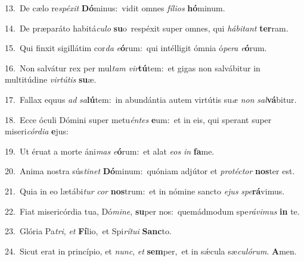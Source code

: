{\numbfont\textcolor{\numbcolor}{13.}}~De cælo re\-\textit{spé}\-\textit{xit} \textbf{Dó}\-minus:~\star vidit omnes \textit{fí}\-\textit{li}\textit{os} \textbf{hó}\-minum.\par
{\numbfont\textcolor{\numbcolor}{14.}}~De præparáto habitá\-\textit{cu}\-\textit{lo} \textbf{su}\-o~\star respéxit super omnes, qui \textit{há}\-\textit{bi}\textit{tant} \textbf{ter}\-ram.\par
{\numbfont\textcolor{\numbcolor}{15.}}~Qui finxit sigillátim cor\textit{da} \textit{e}\-\textbf{ó}rum:~\star qui intélligit ómnia ó\-\textit{pe}\-\textit{ra} \textit{e}\-\textbf{ó}rum.\par
{\numbfont\textcolor{\numbcolor}{16.}}~Non salvátur rex per mul\textit{tam} \textit{vir}\-\textbf{tú}tem:~\star et gigas non salvábitur in multitúdine \textit{vir}\-\textit{tú}\textit{tis} \textbf{su}\-æ.\par
{\numbfont\textcolor{\numbcolor}{17.}}~Fallax equus \textit{ad} \textit{sa}\-\textbf{lú}tem:~\star in abundántia autem virtútis su\textit{æ} \textit{non} \textit{sal}\-\textbf{vá}bitur.\par
{\numbfont\textcolor{\numbcolor}{18.}}~Ecce óculi Dómini super metu\-\textit{én}\-\textit{tes} \textbf{e}\-um:~\star et in eis, qui sperant super miseri\-\textit{cór}\-\textit{di}\textit{a} \textbf{e}\-jus:\par
{\numbfont\textcolor{\numbcolor}{19.}}~Ut éruat a morte áni\textit{mas} \textit{e}\-\textbf{ó}rum:~\star et alat \textit{e}\-\textit{os} \textit{in} \textbf{fa}\-me.\par
{\numbfont\textcolor{\numbcolor}{20.}}~Anima nostra sús\-\textit{ti}\-\textit{net} \textbf{Dó}\-minum:~\star quóniam adjútor et \textit{pro}\-\textit{téc}\textit{tor} \textbf{nos}\-ter est.\par
{\numbfont\textcolor{\numbcolor}{21.}}~Quia in eo lætábi\textit{tur} \textit{cor} \textbf{nos}\-trum:~\star et in nómine sancto \textit{e}\-\textit{jus} \textit{spe}\-\textbf{rá}vimus.\par
{\numbfont\textcolor{\numbcolor}{22.}}~Fiat misericórdia tua, Dó\-\textit{mi}\-\textit{ne}, \textbf{su}\-per nos:~\star quemádmodum spe\-\textit{rá}\-\textit{vi}\textit{mus} \textbf{in} te.\par
{\numbfont\textcolor{\numbcolor}{23.}}~Glória Pa\-\textit{tri}\-, \textit{et} \textbf{Fí}\-lio,~\star et Spi\-\textit{rí}\-\textit{tu}\textit{i} \textbf{Sanc}\-to.\par
{\numbfont\textcolor{\numbcolor}{24.}}~Sicut erat in princípio, et \textit{nunc}\-, \textit{et} \textbf{sem}\-per,~\star et in sǽcula sæ\-\textit{cu}\-\textit{ló}\textit{rum}. \textbf{A}\-men.\par
